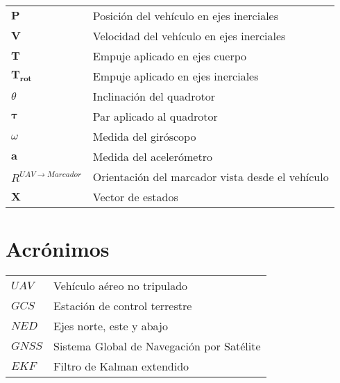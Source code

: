 \chapter*{\notationname}
\pagestyle{especial}
\chaptermark{\notationname}
{}
\begin{longtable}{p{3cm}p{8.5cm}}
$\bm{P}$ & Posición del vehículo en ejes inerciales  \\
$\bm{V}$ & Velocidad del vehículo en ejes inerciales \\
$\bm{T}$ & Empuje aplicado en ejes cuerpo \\
$\bm{T_{rot}}$ & Empuje aplicado en ejes inerciales \\
$\theta$ &  Inclinación del quadrotor \\
$\bm{\tau}$ &  Par aplicado al quadrotor \\
$\omega$ & Medida del giróscopo \\
$\bm{a}$ & Medida del acelerómetro \\
$R^{UAV\rightarrow Marcador}$  & Orientación del marcador vista desde el vehículo\\
$\bm{X}$ &  Vector de estados \\
\end{longtable}
\newpage

\chapter*{Acrónimos}
\pagestyle{especial}
{}
\begin{longtable}{p{3cm}p{8.5cm}}
$UAV$ & Vehículo aéreo no tripulado\\
$GCS$ & Estación de control terrestre \\
$NED$ & Ejes norte, este y abajo \\
$GNSS$ & Sistema Global de Navegación por Satélite \\
$EKF$ & Filtro de Kalman extendido \\
\end{longtable}
\newpage

